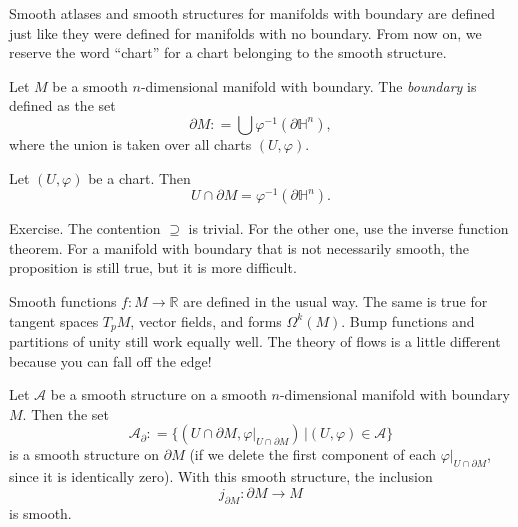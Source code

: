 \documentclass{ximera}
\begin{document}
    \begin{remark}
        Smooth atlases and smooth structures for manifolds with boundary are defined just like they were defined for manifolds with no boundary. From now on, we reserve the word ``chart'' for a chart belonging to the smooth structure.
    \end{remark}

\begin{definition}[Boundary]
    Let $M$ be a smooth $n$-dimensional manifold with boundary. The \emph{boundary} is defined as the set 
\[     \partial M : =  \bigcup   \varphi ^{-1} ( \partial  \mathbb{H}^n   )   ,   \]
where the union is taken over all charts $(U,\varphi)$.
\end{definition}

\begin{proposition}
    Let $(U,\varphi) $ be a chart. Then
\[     U \cap \partial M = \varphi ^{-1} (  \partial  \mathbb{H}^n   )     .      \]
\end{proposition}

\begin{solution}
Exercise. The contention $\supseteq$  is trivial. For the other one, use the inverse function theorem. For a manifold with boundary that is not necessarily smooth, the proposition is still true, but it is more difficult. 
\end{solution}


\begin{remark}
    Smooth functions $f: M \to \mathbb{R}$ are defined in the usual way. The same is true for tangent spaces $T_pM$, vector fields, and forms $\Omega ^k (M)$.   Bump functions and partitions of unity still work equally well.  The theory of flows is a little different because you can fall off the edge! 
\end{remark}



\begin{proposition}
    Let $\mathcal{A}$ be a smooth structure on a smooth $n$-dimensional manifold with boundary  $M$. Then the set 
    \[  \mathcal{A}_{\partial } : =  \{  ( U \cap \partial M  ,  \varphi \vert _{U \cap \partial M}  ) \, \vert (U ,\varphi) \in \mathcal{A} \}   \] 
    is a smooth structure on $\partial M$ (if we delete the first component of each $\varphi \vert _{U \cap \partial M }$, since it is identically zero). With this smooth structure, the inclusion 
    \[ j _{\partial M} : \partial M \to M \]  
    is smooth. 
\end{proposition}
\end{document}
